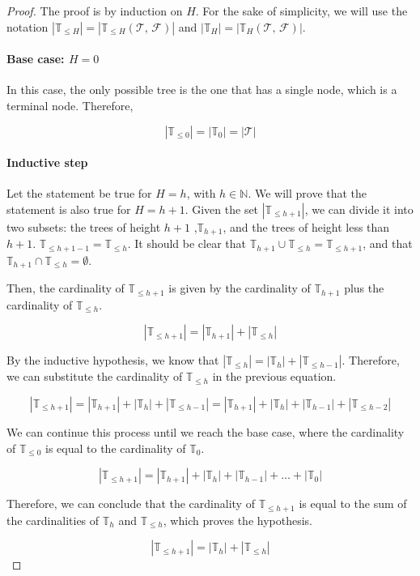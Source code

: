   \begin{proof}
    The proof is by induction on \(H\).
    For the sake of simplicity, we will use the notation
    \(|\mathbb{T}_{\leq H}| = |\mathbb{T}_{\leq H}(\mathcal{T},\, \mathcal{F})|\)
    and \(|\mathbb{T}_{H}| = |\mathbb{T}_{H}(\mathcal{T},\, \mathcal{F})|\).

    \paragraph{Base case: \(H = 0\)}
    In this case, the only possible tree is the one that has a single node,
    which is a terminal node.
    Therefore, 
    
    \[
      |\mathbb{T}_{\leq 0}| = |\mathbb{T}_{0}| = |\mathcal{T}|
    \]

    \paragraph{Inductive step}
    Let the statement be true for \(H = h\), with \(h \in \mathbb{N}\).
    We will prove that the statement is also true for \(H = h + 1\).
    Given the set \(|\mathbb{T}_{\leq h + 1}|\), we can divide it into two
    subsets: the trees of height \(h + 1\) ,\(\mathbb{T}_{h + 1}\), and the
    trees of height less than \(h + 1\). \(\mathbb{T}_{\leq h + 1 - 1} = 
    \mathbb{T}_{\leq h}\).
    It should be clear that \(\mathbb{T}_{h + 1} \cup \mathbb{T}_{\leq h} = 
    \mathbb{T}_{\leq h + 1}\), and that \(\mathbb{T}_{h + 1} \cap 
    \mathbb{T}_{\leq h} = \emptyset\).
    
    Then, the cardinality of \(\mathbb{T}_{\leq h + 1}\) is given by the
    cardinality of \(\mathbb{T}_{h + 1}\) plus the cardinality of
    \(\mathbb{T}_{\leq h}\).

    \[
      |\mathbb{T}_{\leq h + 1}| = |\mathbb{T}_{h + 1}| + |\mathbb{T}_{\leq h}|
    \]

    By the inductive hypothesis, we know that \(|\mathbb{T}_{\leq h}| =
    |\mathbb{T}_{h}| + |\mathbb{T}_{\leq h - 1}|\).
    Therefore, we can substitute the cardinality of \(\mathbb{T}_{\leq h}\) in
    the previous equation.

    \[
      |\mathbb{T}_{\leq h + 1}|
        = |\mathbb{T}_{h + 1}| + |\mathbb{T}_{h}| + |\mathbb{T}_{\leq h - 1}|
        = |\mathbb{T}_{h + 1}| + |\mathbb{T}_{h}| + |\mathbb{T}_{h - 1}|
          + |\mathbb{T}_{\leq h - 2}|
    \]

    We can continue this process until we reach the base case, where the
    cardinality of \(\mathbb{T}_{\leq 0}\) is equal to the cardinality of
    \(\mathbb{T}_{0}\).

    \[
      |\mathbb{T}_{\leq h + 1}|
        = |\mathbb{T}_{h + 1}| + |\mathbb{T}_{h}| + |\mathbb{T}_{h - 1}| + 
          \dots + |\mathbb{T}_{0}|
    \]

    Therefore, we can conclude that the cardinality of 
    \(\mathbb{T}_{\leq h + 1}\) is equal to the sum of the cardinalities of
    \(\mathbb{T}_{h}\) and \(\mathbb{T}_{\leq h}\), which proves the hypothesis.

    \[
      |\mathbb{T}_{\leq h + 1}| = |\mathbb{T}_{h}| + |\mathbb{T}_{\leq h}|
    \]
  \end{proof}


